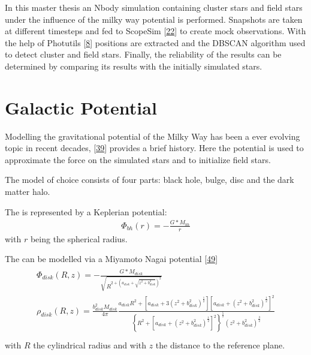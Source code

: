 \documentclass[letterpaper,10pt,english]{sphinxmanual}
\begin{document}
\sphinxAtStartPar
In this master thesis an N\sphinxhyphen{}body simulation containing cluster stars and field stars under the influence of the milky way potential is performed.
Snapshots are taken at different timesteps and fed to ScopeSim {[}\hyperlink{cite.NBodySimulation/Appendix:id50}{22}{]} to create mock observations.
With the help of Photutils {[}\hyperlink{cite.NBodySimulation/Appendix:id54}{8}{]} positions are extracted and the DBSCAN algorithm used to detect cluster and field stars.
Finally, the reliability of the results can be determined by comparing its results with the initially simulated stars.


\chapter{Galactic Potential}
\label{\detokenize{NBodySimulation/Potential:galactic-potential}}\label{\detokenize{NBodySimulation/Potential:galactic-potential-label}}\label{\detokenize{NBodySimulation/Potential::doc}}
\sphinxAtStartPar
Modelling the gravitational potential of the Milky Way has been a ever evolving topic in recent decades, {[}\hyperlink{cite.NBodySimulation/Appendix:id58}{39}{]} provides a brief history.
Here the potential is used to approximate the force on the simulated stars and to initialize field stars.

\sphinxAtStartPar
The model of choice consists of four parts: black hole, bulge, disc and the dark matter halo.

\sphinxAtStartPar
The  is represented by a Keplerian potential:
\begin{equation*}
\begin{split}\Phi_{bh}\left ( r \right ) = -\frac{G*M_{bh}}{r}\end{split}
\end{equation*}
\sphinxAtStartPar
with \(r\) being the spherical radius.

\sphinxAtStartPar
The  can be modelled via a Miyamoto Nagai potential {[}\hyperlink{cite.NBodySimulation/Appendix:id3}{49}{]}
\begin{align*}\!\begin{aligned}
\Phi_{disk}\left ( R,z \right ) = -\frac{G*M_{disk}}{\sqrt{R^{2+\left ( a_{disk}+\sqrt{z^{2}+b_{disk}^{2}} \right )^{2}}}}\\
\rho_{disk}(R,z)=\frac{b_{disk}^{2}M_{disk}}{4\pi}\frac{a_{disk}R^{2}+\left[a_{disk}+3(z^{2}+b_{disk}^{2})^{\frac{1}{2}}\right]\left[a_{disk}+(z^{2}+b_{disk}^{2})^{\frac{1}{2}}\right]^{2}}{\left \{ R^{2}+\left[a_{disk}+(z^{2}+b_{disk}^{2})^{\frac{1}{2}}\right]^{2} \right \}^{\frac{5}{2}}\left(z^{2}+b_{disk}^{2}\right)^{\frac{3}{2}}}\\
\end{aligned}\end{align*}
\sphinxAtStartPar
with \(R\) the cylindrical radius and with \(z\) the distance to the reference plane.
\end{document}
